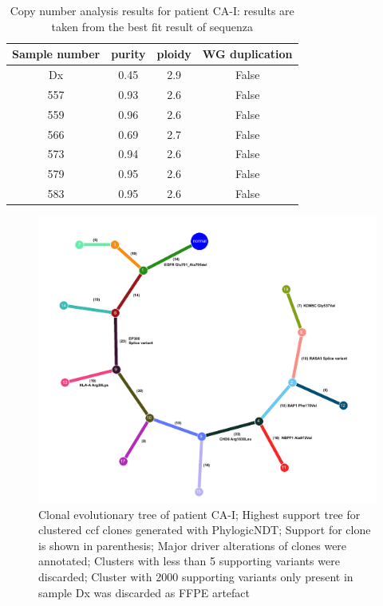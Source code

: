 \begin{table}[ht]
\caption[Copy number analysis results for patient CA-I]{Copy number analysis results for patient CA-I: results are taken from the best fit result of sequenza}\label{tab:ca51cnv}
\centering
{}
\begin{tabular}{|c|c|c|c|}
\toprule
\hline
 \rowcolor{gray!50}
\textbf{Sample number} & \textbf{purity} & \textbf{ploidy} & \textbf{WG duplication}\\
\hline
 Dx  & \num{0.45} & \num{2.9} & False \\
 557 & \num{0.93} & \num{2.6} & False \\
 559 & \num{0.96} & \num{2.6} & False \\
 566 & \num{0.69} & \num{2.7} & False \\
 573 & \num{0.94} & \num{2.6} & False \\
 579 & \num{0.95} & \num{2.6} & False \\
 583 & \num{0.95} & \num{2.6} & False \\
 \hline
\bottomrule
\end{tabular}
\end{table} 


\begin{figure}[htp]
\centering
\includegraphics[width=.99\linewidth]{Figures/CASCADE/CA51/CA51.clonaltree.pdf}
\caption[Clonal evolutionary tree CA-I]{Clonal evolutionary tree of patient CA-I; Highest support tree for clustered ccf clones generated with PhylogicNDT; Support for clone is shown in parenthesis; Major driver alterations of clones were annotated; Clusters with less than 5 supporting variants were discarded; Cluster with 2000 supporting variants only present in sample Dx was discarded as FFPE artefact} \label{fig:ca51.clonalTree}
\end{figure}


